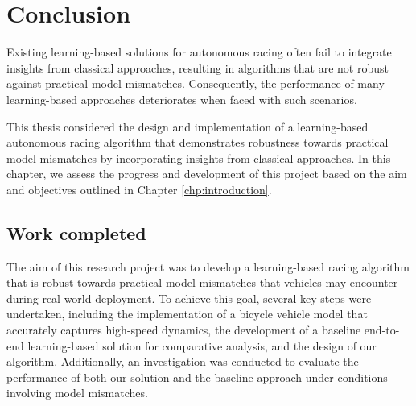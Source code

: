\chapter{Conclusion}\label{chp:conclusion}



Existing learning-based solutions for autonomous racing often fail to integrate insights from classical approaches, resulting in algorithms that are not robust against practical model mismatches. 
Consequently, the performance of many learning-based approaches deteriorates when faced with such scenarios.

This thesis considered the design and implementation of a learning-based autonomous racing algorithm that demonstrates robustness towards practical model mismatches by incorporating insights from classical approaches.
In this chapter, we assess the progress and development of this project based on the aim and objectives outlined in Chapter \ref{chp:introduction}.



\section{Work completed}

The aim of this research project was to develop a learning-based racing algorithm that is robust towards practical model mismatches that vehicles may encounter during real-world deployment.
To achieve this goal, several key steps were undertaken, including the implementation of a bicycle vehicle model that accurately captures high-speed dynamics, the development of a baseline end-to-end learning-based solution for comparative analysis, and the design of our algorithm. Additionally, an investigation was conducted to evaluate the performance of both our solution and the baseline approach under conditions involving model mismatches.


